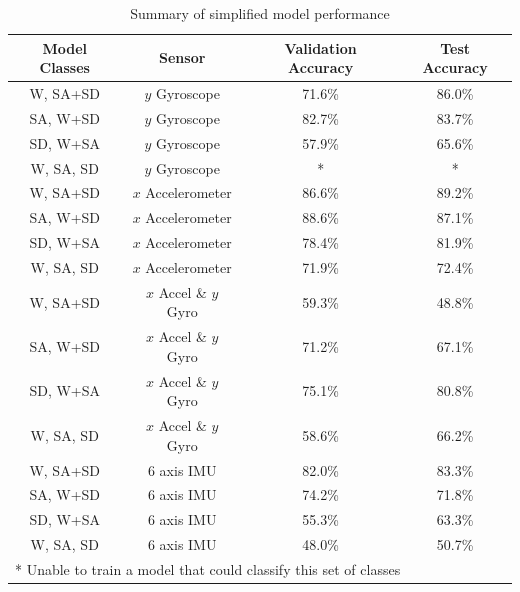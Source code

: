 \documentclass[sensors,article,submit,moreauthors,pdftex]{Definitions/mdpi}
\begin{document}
\begin{table}[!hbt]
    \centering
    \caption{Summary of simplified model performance}
    \label{tab:simplified_model_perfomances}
    \begin{tabular}{cccc}
        \textbf{Model Classes} & \textbf{Sensor} & \textbf{Validation Accuracy} & \textbf{Test Accuracy}\\
        \hline
        W, SA+SD & $y$ Gyroscope & 71.6\% & 86.0\% \\
        SA, W+SD & $y$ Gyroscope & 82.7\% & 83.7\% \\
        SD, W+SA & $y$ Gyroscope & 57.9\% & 65.6\% \\
        W, SA, SD & $y$ Gyroscope & * & * \\
        W, SA+SD & $x$ Accelerometer & 86.6\% & 89.2\% \\
        SA, W+SD & $x$ Accelerometer & 88.6\% & 87.1\% \\
        SD, W+SA & $x$ Accelerometer & 78.4\% & 81.9\% \\
        W, SA, SD & $x$ Accelerometer & 71.9\% & 72.4\%\\
        W, SA+SD & $x$ Accel \& $y$ Gyro & 59.3\% & 48.8\% \\
        SA, W+SD & $x$ Accel \& $y$ Gyro & 71.2\% & 67.1\% \\
        SD, W+SA & $x$ Accel \& $y$ Gyro & 75.1\% & 80.8\% \\
        W, SA, SD & $x$ Accel \& $y$ Gyro & 58.6\% & 66.2\%\\
        W, SA+SD & 6 axis IMU & 82.0\% & 83.3\% \\
        SA, W+SD & 6 axis IMU & 74.2\% & 71.8\% \\
        SD, W+SA & 6 axis IMU & 55.3\% & 63.3\% \\
        W, SA, SD & 6 axis IMU & 48.0\% & 50.7\%\\
        \multicolumn{4}{l}{\footnotesize{* Unable to train a model that could classify this set of classes}}
    \end{tabular}
\end{table}
\end{document}

